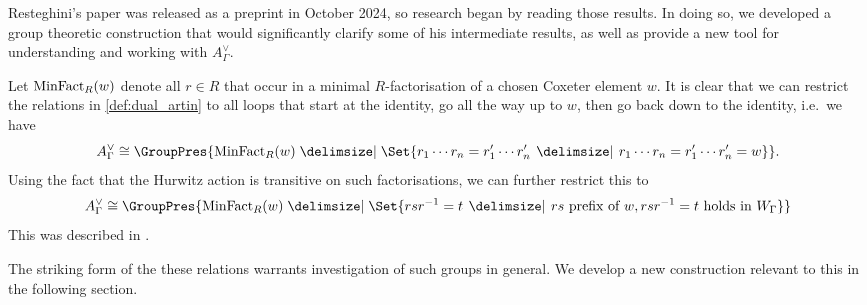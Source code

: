 Resteghini's paper \cite{resteghini_free_2024} was released as a preprint in October 2024, so research began by reading those results.
In doing so, we developed a group theoretic construction that would significantly clarify some of his intermediate results, as well as provide a new tool for understanding and working with $A^\vee_\Gamma$.

Let $\operatorname{MinFact}_R(w)$ denote all  $r \in R$ that occur in a minimal  $R$-factorisation of a chosen Coxeter element  $w$.
It is clear that we can restrict the relations in \cref{def:dual_artin} to all loops that start at the identity, go all the way up to $w$, then go back down to the identity, i.e.~we have
\[
	A^\vee_\Gamma \cong \GroupPres{ \minfact_R(w) \relations \Set{r_1\cdots r_n = r^\prime_1 \cdots r^\prime_n \given r_1 \cdots r_n = r^\prime_1 \cdots r^\prime_n = w}}
	.\]
Using the fact that the Hurwitz action is transitive on such factorisations, we can further restrict this to
\[
	A^\vee_\Gamma \cong \GroupPres{ \minfact_R(w) \relations \Set{rsr^{-1} = t \given rs \text{ prefix of }w, rs r ^{-1} = t \text{ holds in } W_\Gamma}}
\]
This was described in \cite[Lemma 7.11]{bessis_topology_2004}.

The striking form of the these relations warrants investigation of such groups in general.
We develop a new construction relevant to this in the following section.
